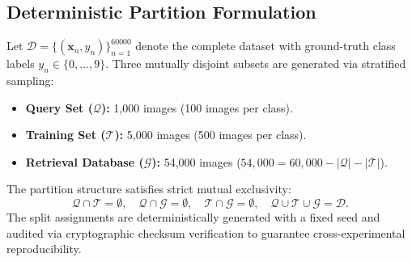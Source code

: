 \documentclass[10pt,conference]{IEEEtran}
\begin{document}
\subsection{Deterministic Partition Formulation}
Let $\mathcal{D} = \{(\mathbf{x}_n, y_n)\}_{n=1}^{60000}$ denote the complete dataset with ground-truth class labels $y_n \in \{0, \dots, 9\}$. Three mutually disjoint subsets are generated via stratified sampling:
\begin{itemize}
    \item \textbf{Query Set ($\mathcal{Q}$):} 1,000 images (100 images per class).
    \item \textbf{Training Set ($\mathcal{T}$):} 5,000 images (500 images per class).
    \item \textbf{Retrieval Database ($\mathcal{G}$):} 54,000 images ($54{,}000 = 60{,}000 - |\mathcal{Q}| - |\mathcal{T}|$).
\end{itemize}
The partition structure satisfies strict mutual exclusivity:
\begin{equation}
    \mathcal{Q} \cap \mathcal{T} = \emptyset, \quad \mathcal{Q} \cap \mathcal{G} = \emptyset, \quad \mathcal{T} \cap \mathcal{G} = \emptyset, \quad \mathcal{Q} \cup \mathcal{T} \cup \mathcal{G} = \mathcal{D}.
\end{equation}
The split assignments are deterministically generated with a fixed seed and audited via cryptographic checksum verification to guarantee cross-experimental reproducibility.
\end{document}
